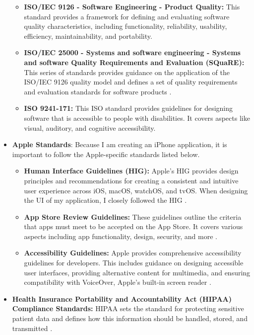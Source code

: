 \begin{itemize}
        \begin{itemize}
        \item \textbf{ISO/IEC 9126 - Software Engineering - Product Quality:} This standard provides a framework for defining and evaluating software quality characteristics, including functionality, reliability, usability, efficiency, maintainability, and portability.
        \item \textbf{ISO/IEC 25000 - Systems and software engineering - Systems and software Quality Requirements and Evaluation (SQuaRE):} This series of standards provides guidance on the application of the ISO/IEC 9126 quality model and defines a set of quality requirements and evaluation standards for software products \cite{ISO}.
        \item \textbf{ISO 9241-171:} This ISO standard provides guidelines for designing software that is accessible to people with disabilities. It covers aspects like visual, auditory, and cognitive accessibility.
        \end{itemize}
    \item \textbf{Apple Standards}: Because I am creating an iPhone application, it is important to follow the Apple-specific standards listed below.
        \begin{itemize}
            \item \textbf{Human Interface Guidelines (HIG):} Apple's HIG provides design principles and recommendations for creating a consistent and intuitive user experience across iOS, macOS, watchOS, and tvOS. When designing the UI of my application, I closely followed the HIG \cite{HIG}.
            \item \textbf{App Store Review Guidelines:} These guidelines outline the criteria that apps must meet to be accepted on the App Store. It covers various aspects including app functionality, design, security, and more \cite{AppStore}.
            \item \textbf{Accessibility Guidelines:} Apple provides comprehensive accessibility guidelines for developers. This includes guidance on designing accessible user interfaces, providing alternative content for multimedia, and ensuring compatibility with VoiceOver, Apple's built-in screen reader \cite{AppleAccessibility}.
        \end{itemize}
    \item \textbf{Health Insurance Portability and Accountability Act (HIPAA) Compliance Standards:} HIPAA sets the standard for protecting sensitive patient data and defines how this information should be handled, stored, and transmitted \cite{HIPPA}.

\end{itemize}
